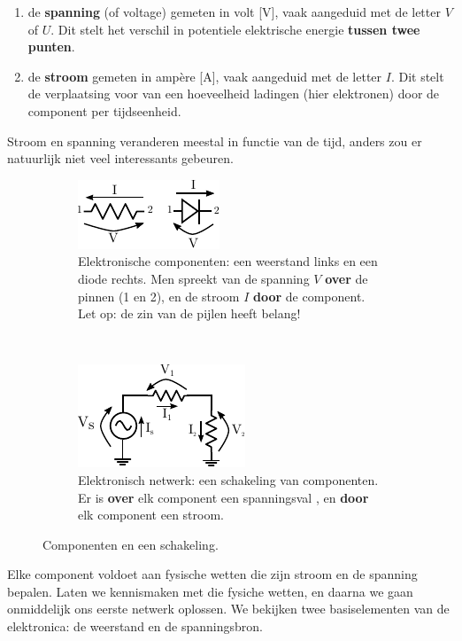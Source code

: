 \documentclass{article}
\begin{document}
\begin{enumerate}
	\item de \textbf{spanning} (of voltage) gemeten in volt [V], vaak aangeduid met de letter $V$ of $U$. Dit stelt het verschil in potentiele elektrische energie \textbf{tussen twee punten}.
	\item de \textbf{stroom} gemeten in ampère [A], vaak aangeduid met de letter $I$. Dit stelt de verplaatsing voor van een hoeveelheid ladingen (hier elektronen) door de component per tijdseenheid.
\end{enumerate}

Stroom en spanning veranderen meestal in functie van de tijd, anders zou er natuurlijk niet veel interessants gebeuren. 

\begin{figure}[hbtp]
	\centering
	\begin{subfigure}[b]{0.45\linewidth}
		\centering
		\includegraphics[width=0.8\linewidth]{componenten}
		\caption{Elektronische componenten: een weerstand links en een diode rechts. Men spreekt van de spanning $V$ \textbf{over} de pinnen (1 en 2), en de stroom $I$ \textbf{door} de component. Let op: de zin van de pijlen heeft belang!}
		\label{subfig:componenten}
	\end{subfigure}
	~
	\begin{subfigure}[b]{0.45\linewidth}
		\centering
		\includegraphics[width=0.8\linewidth]{weerstandsdeler}
		\caption{Elektronisch netwerk: een schakeling van componenten. Er is \textbf{over} elk component een spanningsval , en \textbf{door} elk component een stroom.}
		\label{subfig:netwerk}
	\end{subfigure}
	\caption{Componenten en een schakeling. }
	\label{fig:component_en_schakeling}
\end{figure}
 Elke component voldoet aan fysische wetten die zijn stroom en de spanning bepalen. Laten we kennismaken met die fysiche wetten, en daarna we gaan onmiddelijk ons eerste netwerk oplossen. We bekijken twee basiselementen van de elektronica: de weerstand en de spanningsbron.
\end{document}
